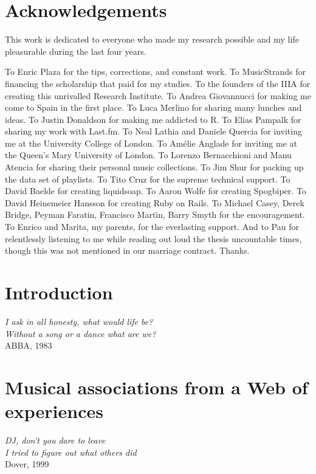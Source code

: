 \documentclass[a4paper,11pt]{memoir}
\theoremstyle{definition}
\newcommand{\songquote}[2]{\begin{flushright}\setromanfont{Minister Std Light}\small\emph{#1} \\\vspace*{5pt} #2 \end{flushright}}
\begin{document}
\chapter*{Acknowledgements}
This work is dedicated to everyone who made my research possible and my life pleasurable during the last four years.

To Enric Plaza for the tips, corrections, and constant work.
To MusicStrands for financing the scholarship that paid for my studies.
To the founders of the IIIA for creating this unrivalled Research Institute.
To Andrea Giovannucci for making me come to Spain in the first place.
To Luca Merlino for sharing many lunches and ideas.
To Justin Donaldson for making me addicted to R.
To Elias Pampalk for sharing my work with Last.fm.
To Neal Lathia and Daniele Quercia for inviting me at the University College of London.
To Am\'{e}lie Anglade for inviting me at the Queen's Mary University of London.
To Lorenzo Bernacchioni and Manu Atencia for sharing their personal music collections.
To Jim Shur for packing up the data set of playlists.
To Tito Cruz for the supreme technical support.
To David Baelde for creating liquidsoap.
To Aaron Wolfe for creating Spogbiper.
To David Heinemeier Hansson for creating Ruby on Rails.
To Michael Casey, Derek Bridge, Peyman Faratin, Francisco Mart\'{\i}n, Barry Smyth for the encouragement.
To Enrico and Marita, my parents, for the everlasting support.
And to Pau for relentlessly listening to me while reading out loud the thesis uncountable times, though this was not mentioned in our marriage contract.
Thanks.
\cleardoublepage
{}

\pagestyle{test}


\chapter{Introduction} %
\label{cha:introduction}
\songquote{I ask in all honesty, what would life be?\\ 
Without a song or a dance what are we?}{ABBA, 1983} 


\chapter{Musical associations from a Web of experiences} %
\label{cha:smoothness}
\songquote{DJ, don't you dare to leave\\
I tried to figure out what others did}{Dover, 1999} 

\end{document}
